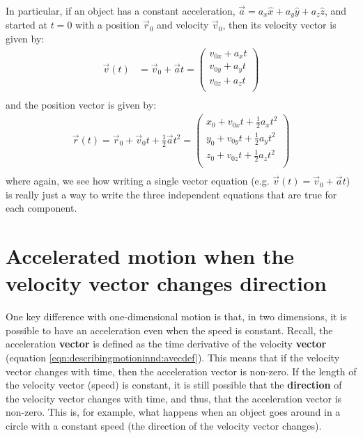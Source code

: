 In particular, if an object has a constant acceleration, $\vec a=a_x\hat x+a_y\hat y+a_z\hat z$, and started at $t=0$ with a position $\vec r_0$ and velocity $\vec v_0$, then its velocity vector is given by:
\begin{align*}
\vec v(t)  &= \vec v_0+\vec at=\begin{pmatrix}
           v_{0x}+ a_xt \\
           v_{0y}+ a_yt \\
           v_{0z}+ a_zt \\
         \end{pmatrix}\\
\end{align*}
and the position vector is given by:
\begin{align*}
\vec r(t)= \vec r_0+\vec v_0 t+\frac{1}{2}\vec a t^2=\begin{pmatrix}
           x_0+v_{0x}t+\frac{1}{2} a_xt^2 \\
           y_0+v_{0y}t+\frac{1}{2} a_yt^2 \\
           z_0+v_{0z}t+\frac{1}{2} a_zt^2 \\
         \end{pmatrix}\\
\end{align*}
where again, we see how writing a single vector equation (e.g. $\vec v(t) = \vec v_0+\vec at$) is really just a way to write the three independent equations that are true for each component.

\section{Accelerated motion when the velocity vector changes direction}
\label{sec:describingmotioninnd:accvconst}
One key difference with one-dimensional motion is that, in two dimensions, it is possible to have an acceleration even when the speed is constant. Recall, the acceleration \textbf{vector} is defined as the time derivative of the velocity \textbf{vector} (equation \ref{eqn:describingmotioninnd:avecdef}). This means that if the velocity vector changes with time, then the acceleration vector is non-zero. If the length of the velocity vector (speed) is constant, it is still possible that the \textbf{direction} of the velocity vector changes with time, and thus, that the acceleration vector is non-zero. This is, for example, what happens when an object goes around in a circle with a constant speed (the direction of the velocity vector changes). 

